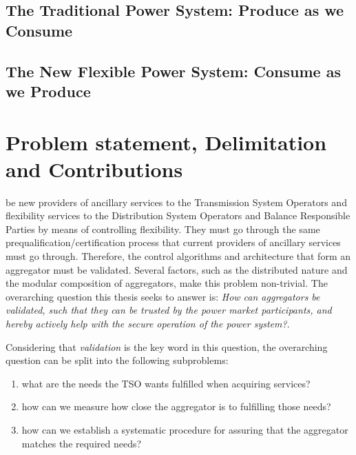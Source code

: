 \subsection*{The Traditional Power System: Produce as we Consume}
\label{sub:traditional}

\subsection*{The New Flexible Power System: Consume as we Produce}
\label{sub:future}


\section{Problem statement, Delimitation and Contributions} %
\label{sec:funneling}
 be new providers of ancillary services to the Transmission System Operators and flexibility services to the Distribution System Operators and Balance Responsible Parties by means of controlling flexibility. They must go through the same prequalification/certification process that current providers of ancillary services must go through. Therefore, the control algorithms and architecture that form an aggregator must be validated. Several factors, such as the distributed nature and the modular composition of aggregators, make this problem non-trivial. The overarching question this thesis seeks to answer is: \emph{How can aggregators be validated, such that they can be trusted by the power market participants, and hereby actively help with the secure operation of the power system?}.

Considering that \emph{validation} is the key word in this question, the overarching question can be split into the following subproblems:
\begin{enumerate}
	\item what are the needs the TSO wants fulfilled when acquiring services?
	\item how can we measure how close the aggregator is to fulfilling those needs?
	\item how can we establish a systematic procedure for assuring that the aggregator matches the required needs?
\end{enumerate}

